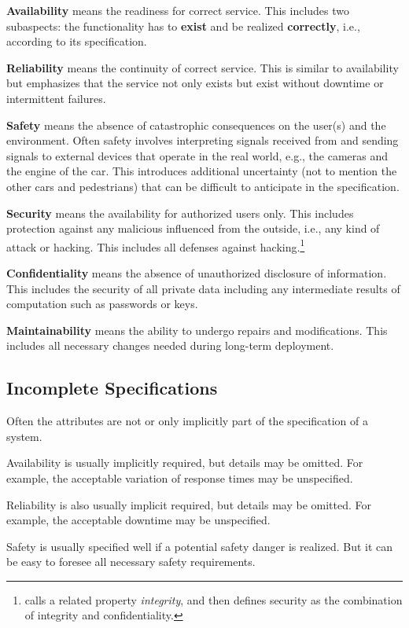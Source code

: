 \textbf{Availability} means the readiness for correct service.
This includes two subaspects: the functionality has to \textbf{exist} and be realized \textbf{correctly}, i.e., according to its specification.

\textbf{Reliability} means the continuity of correct service.
This is similar to availability but emphasizes that the service not only exists but exist without downtime or intermittent failures.

\textbf{Safety} means the absence of catastrophic consequences on the user(s) and the environment.
Often safety involves interpreting signals received from and sending signals to external devices that operate in the real world, e.g., the cameras and the engine of the car.
This introduces additional uncertainty (not to mention the other cars and pedestrians) that can be difficult to anticipate in the specification.

\textbf{Security} means the availability for authorized users only.
This includes protection against any malicious influenced from the outside, i.e., any kind of attack or hacking.
This includes all defenses against hacking.\footnote{\cite{dependability} calls a related property \emph{integrity}, and then defines security as the combination of integrity and confidentiality.}

\textbf{Confidentiality} means the absence of unauthorized disclosure of information.
This includes the security of all private data including any intermediate results of computation such as passwords or keys.

\textbf{Maintainability} means the ability to undergo repairs and modifications.
This includes all necessary changes needed during long-term deployment.

\subsection{Incomplete Specifications}

Often the attributes are not or only implicitly part of the specification of a system.

Availability is usually implicitly required, but details may be omitted.
For example, the acceptable variation of response times may be unspecified.

Reliability is also usually implicit required, but details may be omitted.
For example, the acceptable downtime may be unspecified.

Safety is usually specified well if a potential safety danger is realized.
But it can be easy to foresee all necessary safety requirements.

